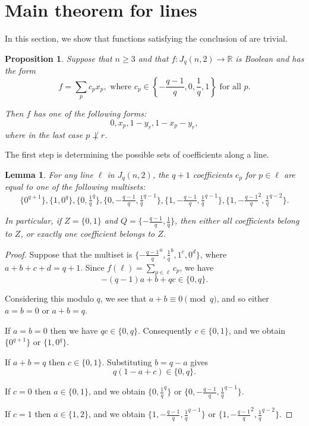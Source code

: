 \documentclass{article}
\newtheorem{proposition}[theorem]{Proposition}
\newtheorem{lemma}[theorem]{Lemma}
\theoremstyle{definition}
\providecommand{\RR}{\mathbb{R}}
\begin{document}
\section{Main theorem for lines}
\label{sec:lines}

In this section, we show that functions satisfying the conclusion of  are trivial.

\begin{proposition} \label{pro:step2}
Suppose that $n \ge 3$ and that $f\colon J_q(n,2) \to \RR$ is Boolean and has the form
\[
 f = \sum_p c_p x_p, \text{ where } c_p \in \left\{-\frac{q-1}{q}, 0, \frac{1}{q}, 1 \right\} \text{ for all } p.
\]

Then $f$ has one of the following forms:
\[
 0, x_p, 1 - y_r, 1 - x_p - y_r,
\]
where in the last case $p \not\perp r$.
\end{proposition}

The first step is determining the possible sets of coefficients along a line.

\begin{lemma} \label{lem:line-coeffs}
For any line $\ell$ in $J_q(n,2)$, the $q+1$ coefficients $c_p$ for $p \in \ell$ are equal to one of the following multisets:
\[
 \{0^{q+1}\}, \{1,0^q\}, \{0,\tfrac{1}{q}^q\}, \{0,-\tfrac{q-1}{q},\tfrac{1}{q}^{q-1}\}, \{1,-\tfrac{q-1}{q},\tfrac{1}{q}^{q-1}\}, \{1,-\tfrac{q-1}{q}^2,\tfrac{1}{q}^{q-2}\}.
\]

In particular, if $Z = \{0,1\}$ and $Q = \{-\frac{q-1}{q},\frac{1}{q}\}$, then either all coefficients belong to $Z$, or exactly one coefficient belongs to $Z$.
\end{lemma}
\begin{proof}
Suppose that the multiset is $\{-\frac{q-1}{q}^a,\frac{1}{q}^b,1^c,0^d\}$, where $a+b+c+d = q+1$. Since $f(\ell) = \sum_{p \in \ell} c_p$, we have
\[
 -(q-1)a + b + qc \in \{0,q\}.
\]

Considering this modulo $q$, we see that $a + b \equiv 0 \pmod{q}$, and so either $a = b = 0$ or $a + b = q$.

If $a = b = 0$ then we have $qc \in \{0,q\}$. Consequently $c \in \{0,1\}$, and we obtain $\{0^{q+1}\}$ or $\{1,0^q\}$.

If $a + b = q$ then $c \in \{0,1\}$. Substituting $b = q - a$ gives
\[
 q(1-a+c) \in \{0,q\}.
\]

If $c = 0$ then $a \in \{0,1\}$, and we obtain $\{0,\frac{1}{q}^q\}$ or $\{0,-\frac{q-1}{q},\frac{1}{q}^{q-1}\}$.

If $c = 1$ then $a \in \{1,2\}$, and we obtain $\{1,-\tfrac{q-1}{q},\tfrac{1}{q}^{q-1}\}$ or $\{1,-\tfrac{q-1}{q}^2,\tfrac{1}{q}^{q-2}\}$.
\end{proof}
\end{document}
